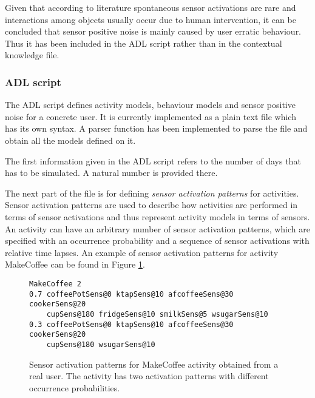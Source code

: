 Given that according to literature spontaneous sensor activations are rare and interactions among objects usually occur due to human intervention, it can be concluded that sensor positive noise is mainly caused by user erratic behaviour. Thus it has been included in the ADL script rather than in the contextual knowledge file.

\subsubsection*{ADL script}

The ADL script defines activity models, behaviour models and sensor positive noise for a concrete user. It is currently implemented as a plain text file which has its own syntax. A parser function has been implemented to parse the file and obtain all the models defined on it. 

The first information given in the ADL script refers to the number of days that has to be simulated. A natural number is provided there.

The next part of the file is for defining \textit{sensor activation patterns} for activities. Sensor activation patterns are used to describe how activities are performed in terms of sensor activations and thus represent activity models in terms of sensors. An activity can have an arbitrary number of sensor activation patterns, which are specified with an occurrence probability and a sequence of sensor activations with relative time lapses. An example of sensor activation patterns for activity MakeCoffee can be found in Figure \ref{fig:sensor-act}.

\begin{figure}[htbp]
\begin{small}
\lstset{linewidth=\textwidth}
\begin{lstlisting}
MakeCoffee 2
0.7 coffeePotSens@0 ktapSens@10 afcoffeeSens@30 cookerSens@20 
    cupSens@180 fridgeSens@10 smilkSens@5 wsugarSens@10
0.3 coffeePotSens@0 ktapSens@10 afcoffeeSens@30 cookerSens@20 
    cupSens@180 wsugarSens@10
\end{lstlisting}
\end{small}
\caption{Sensor activation patterns for MakeCoffee activity obtained from a real user. The activity has two activation patterns with different occurrence probabilities.}
\label{fig:sensor-act}
\end{figure}

